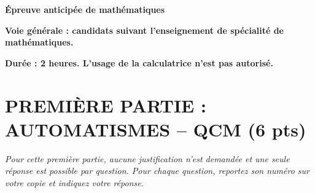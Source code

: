 \documentclass[a4paper,12pt]{article}
\begin{document}
\begin{center}\Large\textbf{Épreuve anticipée de mathématiques}\end{center}
\begin{center}\textbf{Voie générale : candidats suivant l'enseignement de spécialité de mathématiques.}\end{center}

\begin{center}
\textbf{Durée : 2 heures. L'usage de la calculatrice n'est pas autorisé.}
\end{center}

\section*{PREMIÈRE PARTIE : AUTOMATISMES -- QCM (6 pts)}

\textit{Pour cette première partie, aucune justification n'est demandée et une seule réponse est possible par question. Pour chaque question, reportez son numéro sur votre copie et indiquez votre réponse.}
\end{document}
